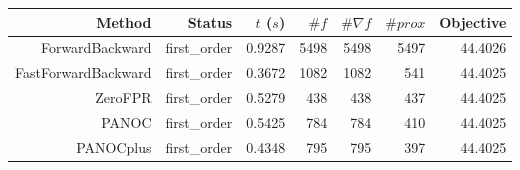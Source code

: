 \begin{tabular}{rrrrrrr}
  \toprule
  \textbf{Method} & \textbf{Status} & \textbf{$t$ ($s$)} & \textbf{$\#f$} & \textbf{$\#\nabla f$} & \textbf{$\#prox$} & \textbf{Objective} \\
  \midrule
  ForwardBackward & first\_order & 0.9287 & 5498 & 5498 & 5497 & 44.4026 \\
  FastForwardBackward & first\_order & 0.3672 & 1082 & 1082 & 541 & 44.4025 \\
  ZeroFPR & first\_order & 0.5279 & 438 & 438 & 437 & 44.4025 \\
  PANOC & first\_order & 0.5425 & 784 & 784 & 410 & 44.4025 \\
  PANOCplus & first\_order & 0.4348 & 795 & 795 & 397 & 44.4025 \\
  \bottomrule
\end{tabular}
